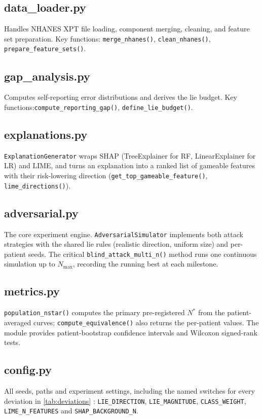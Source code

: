 \documentclass[12pt, a4paper, oneside]{report}
\theoremstyle{definition}
\begin{document}

\subsection{data\_loader.py}
Handles NHANES XPT file loading, component merging, cleaning, and
feature set preparation. Key functions: \texttt{merge\_nhanes()},
\texttt{clean\_nhanes()}, \texttt{prepare\_feature\_sets()}.

\subsection{gap\_analysis.py}
Computes self-reporting error distributions and derives the lie budget.
Key functions:\newline\texttt{compute\_reporting\_gap()}, \texttt{define\_lie\_budget()}.

\subsection{explanations.py}
\texttt{ExplanationGenerator} wraps SHAP (TreeExplainer for RF,
LinearExplainer for LR) and LIME, and turns an explanation into a
ranked list of gameable features with their risk-lowering direction
(\texttt{get\_top\_gameable\_feature()}, \texttt{lime\_directions()}).

\subsection{adversarial.py}
The core experiment engine. \texttt{AdversarialSimulator} implements both
attack strategies with the shared lie rules (realistic direction,
uniform size) and per-patient seeds. The critical
\texttt{blind\_attack\_multi\_n()} method runs one continuous simulation
up to $N_{\max}$, recording the running best at each milestone.

\subsection{metrics.py}
\texttt{population\_nstar()} computes the primary pre-registered $N^*$
from the patient-averaged curves; \texttt{compute\_equivalence()} also
returns the per-patient values. The module provides patient-bootstrap
confidence intervals and Wilcoxon signed-rank tests.

\subsection{config.py}
All seeds, paths and experiment settings, including the named switches
for every deviation in \cref{tab:deviations} :
\texttt{LIE\_DIRECTION}, \texttt{LIE\_MAGNITUDE},
\texttt{CLASS\_WEIGHT}, \texttt{LIME\_N\_FEATURES} and
\texttt{SHAP\_BACKGROUND\_N}.
\end{document}
